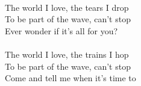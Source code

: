 \\
The world I love, the tears I drop \\
To be part of the wave, can't stop \\
Ever wonder if it's all for you? \\
\\
The world I love, the trains I hop \\
To be part of the wave, can't stop \\
Come and tell me when it's time to